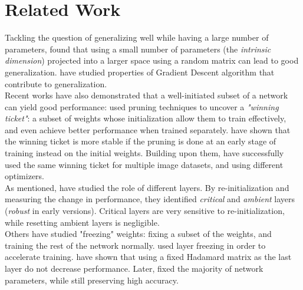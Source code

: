 \documentclass{article}
\begin{document}
\section{Related Work}
Tackling the question of generalizing well while having a large number of parameters, \cite{intrinsic} found that using a small number of parameters (the \textit{intrinsic dimension}) projected into a larger space using a random matrix can lead to good generalization. \cite{sgdAlign} have studied properties of Gradient Descent algorithm that contribute to generalization.\\
Recent works have also demonstrated that a well-initiated subset of a network can yield good performance: \cite{frankle2018lottery} used pruning techniques to uncover a \textit{"winning ticket"}: a subset of weights whose initialization allow them to train effectively, and even achieve better performance when trained separately. \cite{lotteryAtScale} have shown that the winning ticket is more stable if the pruning is done at an early stage of training instead on the initial weights. Building upon them, \cite{generalizingLottery} have successfully used the same winning ticket for multiple image datasets, and using different optimizers.\\
As mentioned, \cite{allLayers} have studied the role of different layers. By re-initialization and measuring the change in performance, they identified \textit{critical} and \textit{ambient} layers (\textit{robust} in early versions). Critical layers are very sensitive to re-initialization, while resetting ambient layers is negligible.\\
Others have studied "freezing" weights: fixing a subset of the weights, and training the rest of the network normally. \cite{freezeout} used layer freezing in order to accelerate training. \cite{fixLastLayerToHadamard} have shown that using a fixed Hadamard matrix as the last layer do not decrease performance. Later, \cite{learningNothing} fixed the majority of network parameters, while still preserving high accuracy. 
\end{document}
